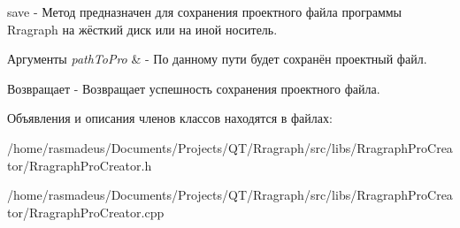 save -\/ Метод предназначен для сохранения проектного файла программы \-Rragraph на жёсткий диск или на иной носитель. 


\begin{DoxyParams}{Аргументы}
{\em path\-To\-Pro} & -\/ По данному пути будет сохранён проектный файл. \\
\hline
\end{DoxyParams}
\begin{DoxyReturn}{Возвращает}
-\/ Возвращает успешность сохранения проектного файла. 
\end{DoxyReturn}


Объявления и описания членов классов находятся в файлах\-:\begin{DoxyCompactItemize}
\item 
/home/rasmadeus/\-Documents/\-Projects/\-Q\-T/\-Rragraph/src/libs/\-Rragraph\-Pro\-Creator/\-Rragraph\-Pro\-Creator.\-h\item 
/home/rasmadeus/\-Documents/\-Projects/\-Q\-T/\-Rragraph/src/libs/\-Rragraph\-Pro\-Creator/\-Rragraph\-Pro\-Creator.\-cpp\end{DoxyCompactItemize}
